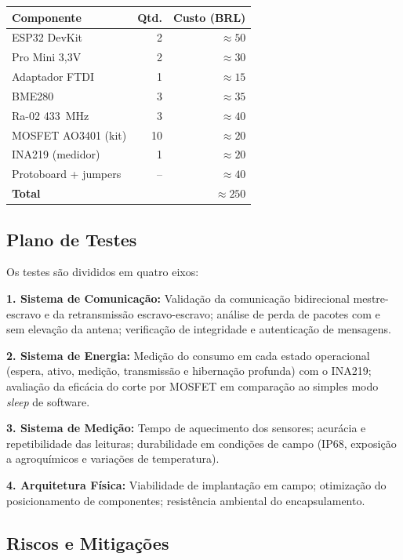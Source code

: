 \documentclass[12pt,a4paper]{article}
\begin{document}
\begin{center}
\begin{tabular}{lrr}
\toprule
\textbf{Componente} & \textbf{Qtd.} & \textbf{Custo (BRL)} \\
\midrule
ESP32 DevKit         & 2 & $\approx 50$ \\
Pro Mini 3,3V        & 2 & $\approx 30$ \\
Adaptador FTDI       & 1 & $\approx 15$ \\
BME280               & 3 & $\approx 35$ \\
Ra-02 433~MHz        & 3 & $\approx 40$ \\
MOSFET AO3401 (kit) & 10 & $\approx 20$ \\
INA219 (medidor)     & 1 & $\approx 20$ \\
Protoboard + jumpers & -- & $\approx 40$ \\
\midrule
\textbf{Total}       &   & $\approx 250$ \\
\bottomrule
\end{tabular}
\end{center}

\subsection{Plano de Testes}

Os testes são divididos em quatro eixos:

\textbf{1. Sistema de Comunicação:} Validação da comunicação bidirecional
mestre-escravo e da retransmissão escravo-escravo; análise de perda de pacotes com
e sem elevação da antena; verificação de integridade e autenticação de mensagens.

\textbf{2. Sistema de Energia:} Medição do consumo em cada estado operacional
(espera, ativo, medição, transmissão e hibernação profunda) com o INA219;
avaliação da eficácia do corte por MOSFET em comparação ao simples
modo \textit{sleep} de software.

\textbf{3. Sistema de Medição:} Tempo de aquecimento dos sensores; acurácia e
repetibilidade das leituras; durabilidade em condições de campo (IP68,
exposição a agroquímicos e variações de temperatura).

\textbf{4. Arquitetura Física:} Viabilidade de implantação em campo; otimização do
posicionamento de componentes; resistência ambiental do encapsulamento.

\subsection{Riscos e Mitigações}
\end{document}
